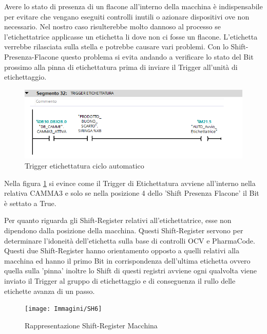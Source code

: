 \documentclass[12pt, a4paper, oneside]{book}
\begin{document}
Avere lo stato di presenza di un flacone all'interno della macchina è indispensabile per evitare che vengano eseguiti controlli inutili o azionare dispositivi ove non necessario. Nel nostro caso risulterebbe molto dannoso al processo se l'etichettatrice applicasse un etichetta li dove non ci fosse un flacone. L'etichetta verrebbe rilasciata sulla stella e potrebbe causare vari problemi. Con lo Shift-Presenza-Flacone questo problema si evita andando a verificare lo stato del Bit prossimo alla pinna di etichettatura prima di inviare il Trigger all'unità di etichettaggio. 

\begin{figure}[H]
	\centering
	\includegraphics[width=12cm]{Immagini/SH5}
	\caption{Trigger etichettatura ciclo automatico}
	\label{sh5}
\end{figure}

Nella figura \ref{sh5} si evince come il Trigger di Etichettatura avviene all'interno nella relativa CAMMA3 e solo se nella posizione 4 dello 'Shift Presenza Flacone' il Bit è settato a True.

Per quanto riguarda gli Shift-Register relativi all'etichettatrice, esse non dipendono dalla posizione della macchina. Questi Shift-Register servono per determinare l'idoneità dell'etichetta sulla base di controlli OCV e PharmaCode.
\\Questi due Shift-Register hanno orientamento opposto a quelli relativi alla macchina ed hanno il primo Bit in corrispondenza dell'ultima etichetta ovvero quella sulla 'pinna' inoltre lo Shift di questi registri avviene ogni qualvolta viene inviato il Trigger al gruppo di etichettaggio e di conseguenza il rullo delle etichette avanza di un passo. 

\begin{figure}[H]
	\centering
	\texttt{[image: Immagini/SH6]}
	\caption{Rappresentazione Shift-Register Macchina}
	\label{sh6}
\end{figure}
\end{document}
